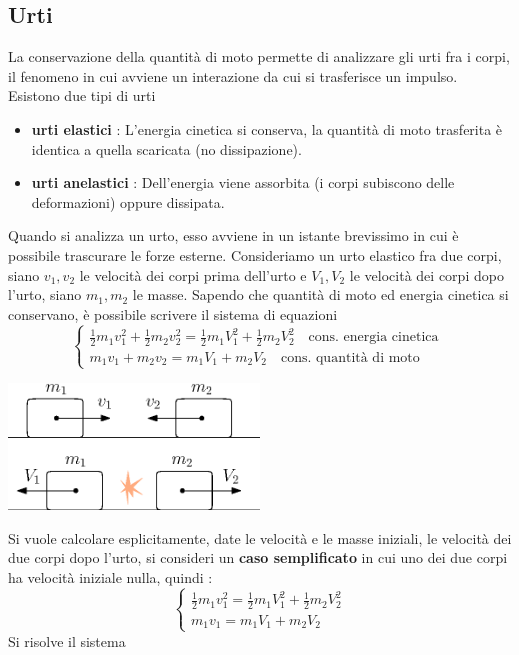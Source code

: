 \documentclass[10pt, letterpaper]{report}
\begin{document}
\subsection{Urti}
La conservazione della quantità di moto permette di analizzare 
gli urti fra i corpi, il fenomeno in cui avviene un interazione da cui 
si trasferisce un impulso. Esistono due tipi di urti\begin{itemize}
    \item \textbf{urti elastici} : L'energia cinetica si conserva, la quantità di 
    moto trasferita è identica a quella scaricata (no dissipazione). 
    \item \textbf{urti anelastici} : Dell'energia viene assorbita (i corpi 
    subiscono delle deformazioni) oppure dissipata.
\end{itemize}
Quando si analizza un urto, esso avviene in un istante brevissimo in 
cui è possibile 
trascurare le forze esterne. Consideriamo un urto elastico fra due 
corpi, siano $v_1,v_2$ le velocità dei corpi prima dell'urto e 
$V_1,V_2$ le velocità dei corpi dopo l'urto, siano $m_1,m_2$ le masse. Sapendo che quantità di moto ed 
energia cinetica si conservano, è possibile scrivere il sistema di equazioni 
$$ \begin{cases}
    \frac{1}{2}m_1v_1^2+\frac{1}{2}m_2v_2^2 =  \frac{1}{2}m_1V_1^2+\frac{1}{2}m_2V_2^2   \ \ \ \text{ cons. energia cinetica }\\
    m_1v_1+m_2v_2 = m_1V_1+m_2V_2 \ \ \ \text{ cons. quantità di moto }
\end{cases}$$
\begin{center}
    \includegraphics[width=0.5\textwidth ]{images/urti.eps}
\end{center}
Si vuole calcolare esplicitamente, date le velocità e le masse iniziali, le 
velocità dei due corpi dopo l'urto, si consideri un \textbf{caso semplificato} 
in cui uno dei due corpi ha velocità iniziale nulla, quindi : 
$$ \begin{cases}
    \frac{1}{2}m_1v_1^2=   \frac{1}{2}m_1V_1^2+\frac{1}{2}m_2V_2^2 \\
    m_1v_1 = m_1V_1+m_2V_2 
\end{cases}$$
Si risolve il sistema 
\end{document}
